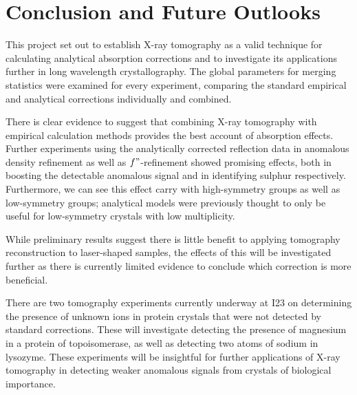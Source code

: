 \section{Conclusion and Future Outlooks}

This project set out to establish X-ray tomography as a valid technique for calculating analytical absorption corrections and to investigate its applications further in long wavelength crystallography. The global parameters for merging statistics were examined for every experiment, comparing the standard empirical and analytical corrections individually and combined.

There is clear evidence to suggest that combining X-ray tomography with empirical calculation methods provides the best account of absorption effects. Further experiments using the analytically corrected reflection data in anomalous density refinement as well as $f"$-refinement showed promising effects, both in boosting the detectable anomalous signal and in identifying sulphur respectively.
Furthermore, we can see this effect carry with high-symmetry groups as well as low-symmetry groups; analytical models were previously thought to only be useful for low-symmetry crystals with low multiplicity.

While preliminary results suggest there is little benefit to applying tomography reconstruction to laser-shaped samples, the effects of this will be investigated further as there is currently limited evidence to conclude which correction is more beneficial.

There are two tomography experiments currently underway at I23 on determining the presence of unknown ions in protein crystals that were not detected by standard corrections. These will investigate detecting the presence of magnesium in a protein of topoisomerase, as well as detecting two atoms of sodium in lysozyme. These experiments will be insightful for further applications of X-ray tomography in detecting weaker anomalous signals from crystals of biological importance.

